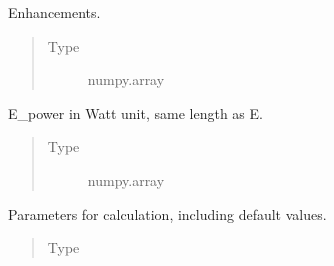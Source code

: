 \documentclass[letterpaper,10pt,english]{sphinxmanual}
\begin{document}
\begin{fulllineitems}
\begin{fulllineitems}
\begin{quote}
\begin{description}
\end{description}\end{quote}

\end{fulllineitems}


\begin{fulllineitems}
\label{\detokenize{dnpHydration:dnpLab.dnpHydration.HydrationCalculator.E}}
Enhancements.
\begin{quote}\begin{description}
\item[{Type}] \leavevmode
numpy.array

\end{description}\end{quote}

\end{fulllineitems}


\begin{fulllineitems}
\label{\detokenize{dnpHydration:dnpLab.dnpHydration.HydrationCalculator.E_power}}
E\_power in Watt unit, same length as E.
\begin{quote}\begin{description}
\item[{Type}] \leavevmode
numpy.array

\end{description}\end{quote}

\end{fulllineitems}


\begin{fulllineitems}
\label{\detokenize{dnpHydration:dnpLab.dnpHydration.HydrationCalculator.hp}}
Parameters for calculation, including default
values.
\begin{quote}\begin{description}
\item[{Type}] \leavevmode
{\hyperref[\detokenize{dnpHydration:dnpLab.dnpHydration.HydrationParameter}]{}}


\end{description}
\end{quote}
\end{fulllineitems}
\end{fulllineitems}
\end{document}
